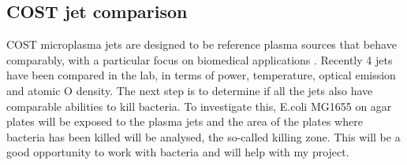 \documentclass[11pt, oneside]{article}   	%
\newcommand{\todo}[1]{ \textcolor{red}{\bf{To Do:} #1}}
\begin{document}

\subsection{COST jet comparison}

COST microplasma jets are designed to be reference plasma sources that behave comparably, with a particular focus on biomedical applications \cite{Golda2016concepts}.
Recently 4 jets have been compared in the lab, in terms of power, temperature, optical emission and atomic O density.
The next step is to determine if all the jets also have comparable abilities to kill bacteria.
To investigate this, E.coli MG1655 on agar plates will be exposed to the plasma jets and the area of the plates where bacteria has been killed will be analysed, the so-called killing zone.
This will be a good opportunity to work with bacteria and will help with my project.

 
\end{document}
